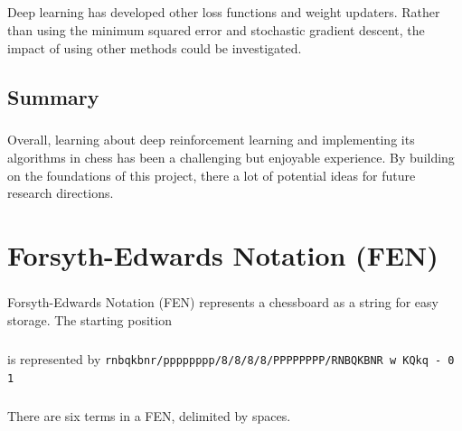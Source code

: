 \documentclass[12pt,a4paper]{book}
\begin{document}
\paragraph{} Deep learning has developed other loss functions and weight updaters. Rather than using the minimum squared error and stochastic gradient descent, the impact of using other methods could be investigated.

\section{Summary}

\paragraph{} Overall, learning about deep reinforcement learning and implementing its algorithms in chess has been a challenging but enjoyable experience. By building on the foundations of this project, there a lot of potential ideas for future research directions.
















 



\appendix

\chapter{Forsyth-Edwards Notation (FEN)}

\paragraph{} Forsyth-Edwards Notation (FEN) represents a chessboard as a string for easy storage. The starting position

\begin{center}
  \medskip
  \newgame
  \showboard
\end{center}

\paragraph{} is represented by \texttt{rnbqkbnr/pppppppp/8/8/8/8/PPPPPPPP/RNBQKBNR w KQkq - 0 1}

\paragraph{} There are six terms in a FEN, delimited by spaces.
\end{document}
